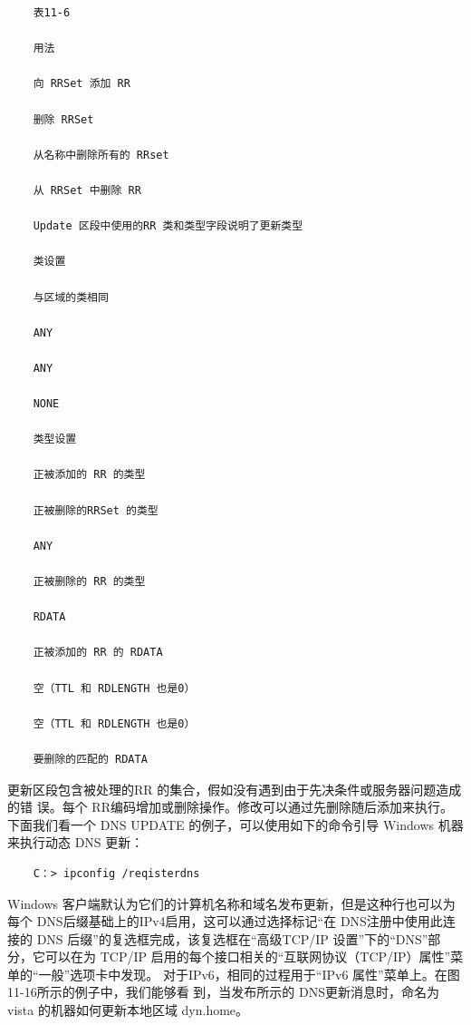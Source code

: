\begin{verbatim}
    表11-6
    
    用法
    
    向 RRSet 添加 RR
    
    删除 RRSet
    
    从名称中删除所有的 RRset
    
    从 RRSet 中删除 RR
    
    Update 区段中使用的RR 类和类型字段说明了更新类型
    
    类设置
    
    与区域的类相同
    
    ANY
    
    ANY
    
    NONE
    
    类型设置
    
    正被添加的 RR 的类型
    
    正被删除的RRSet 的类型
    
    ANY
    
    正被删除的 RR 的类型
    
    RDATA
    
    正被添加的 RR 的 RDATA
    
    空（TTL 和 RDLENGTH 也是0）
    
    空（TTL 和 RDLENGTH 也是0）
    
    要删除的匹配的 RDATA
\end{verbatim}

更新区段包含被处理的RR 的集合，假如没有遇到由于先决条件或服务器问题造成的错
误。每个 RR编码增加或删除操作。修改可以通过先删除随后添加来执行。下面我们看一个
DNS UPDATE 的例子，可以使用如下的命令引导 Windows 机器来执行动态 DNS 更新：

\begin{verbatim}
    C：> ipconfig /reqisterdns
\end{verbatim}

Windows 客户端默认为它们的计算机名称和域名发布更新，但是这种行也可以为每个
DNS后缀基础上的IPv4启用，这可以通过选择标记“在 DNS注册中使用此连接的 DNS
后缀”的复选框完成，该复选框在“高级TCP/IP 设置”下的“DNS”部分，它可以在为
TCP/IP 启用的每个接口相关的“互联网协议（TCP/IP）属性”菜单的“一般”选项卡中发现。
对于IPv6，相同的过程用于“IPv6 属性”菜单上。在图11-16所示的例子中，我们能够看
到，当发布所示的 DNS更新消息时，命名为vista 的机器如何更新本地区域 dyn.home。

